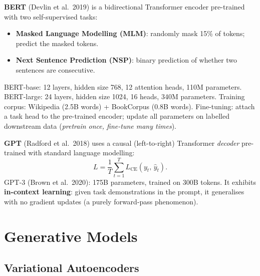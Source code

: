 \documentclass[oneside]{book}
\begin{document}
\textbf{BERT} (Devlin et al.\ 2019) is a bidirectional Transformer encoder
pre-trained with two self-supervised tasks:
\begin{itemize}
  \item \textbf{Masked Language Modelling (MLM)}: randomly mask 15\% of
        tokens; predict the masked tokens.
  \item \textbf{Next Sentence Prediction (NSP)}: binary prediction of whether
        two sentences are consecutive.
\end{itemize}
BERT-base: 12 layers, hidden size 768, 12 attention heads, 110M parameters.
BERT-large: 24 layers, hidden size 1024, 16 heads, 340M parameters.
Training corpus: Wikipedia (2.5B words) + BookCorpus (0.8B words).
Fine-tuning: attach a task head to the pre-trained encoder; update all
parameters on labelled downstream data (\emph{pretrain once, fine-tune many
times}).

\textbf{GPT} (Radford et al.\ 2018) uses a causal (left-to-right) Transformer
\emph{decoder} pre-trained with standard language modelling:
\[
    L = \frac{1}{T}\sum_{t=1}^{T} L_{\mathrm{CE}}(y_t,\,\hat y_t).
\]
GPT-3 (Brown et al.\ 2020): 175B parameters, trained on 300B tokens.
It exhibits \textbf{in-context learning}: given task demonstrations in the
prompt, it generalises with no gradient updates (a purely forward-pass
phenomenon).



\part{Generative Models}

\chapter{Variational Autoencoders}
\end{document}
